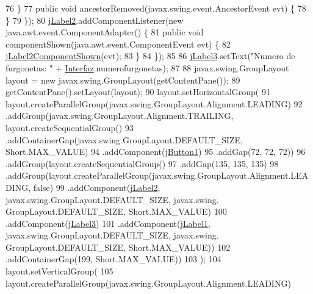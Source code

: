 \begin{DoxyCode}
76             \}
77             \textcolor{keyword}{public} \textcolor{keywordtype}{void} ancestorRemoved(javax.swing.event.AncestorEvent evt) \{
78             \}
79         \});
80         \mbox{\hyperlink{classejercicio2_1_1_interfaz_estadisticas_a227479001256e104ad41996508f6125e}{jLabel2}}.addComponentListener(\textcolor{keyword}{new} java.awt.event.ComponentAdapter() \{
81             \textcolor{keyword}{public} \textcolor{keywordtype}{void} componentShown(java.awt.event.ComponentEvent evt) \{
82                 \mbox{\hyperlink{classejercicio2_1_1_interfaz_estadisticas_a5108f18639c11d9e4c3e1b5db4a19f17}{jLabel2ComponentShown}}(evt);
83             \}
84         \});
85 
86         \mbox{\hyperlink{classejercicio2_1_1_interfaz_estadisticas_a7cdf095cdfd4621585f0a166faab002e}{jLabel3}}.setText(\textcolor{stringliteral}{"Numero de furgonetas: "} + \mbox{\hyperlink{namespace_interfaz}{Interfaz}}.numerofurgonetas);
87 
88         javax.swing.GroupLayout layout = \textcolor{keyword}{new} javax.swing.GroupLayout(getContentPane());
89         getContentPane().setLayout(layout);
90         layout.setHorizontalGroup(
91             layout.createParallelGroup(javax.swing.GroupLayout.Alignment.LEADING)
92             .addGroup(javax.swing.GroupLayout.Alignment.TRAILING, layout.createSequentialGroup()
93                 .addContainerGap(javax.swing.GroupLayout.DEFAULT\_SIZE, Short.MAX\_VALUE)
94                 .addComponent(\mbox{\hyperlink{classejercicio2_1_1_interfaz_estadisticas_a2e04a5a0eb4f298d827c33c859436a97}{jButton1}})
95                 .addGap(72, 72, 72))
96             .addGroup(layout.createSequentialGroup()
97                 .addGap(135, 135, 135)
98                 .addGroup(layout.createParallelGroup(javax.swing.GroupLayout.Alignment.LEADING, \textcolor{keyword}{false})
99                     .addComponent(\mbox{\hyperlink{classejercicio2_1_1_interfaz_estadisticas_a227479001256e104ad41996508f6125e}{jLabel2}}, javax.swing.GroupLayout.DEFAULT\_SIZE, javax.swing.
      GroupLayout.DEFAULT\_SIZE, Short.MAX\_VALUE)
100                     .addComponent(\mbox{\hyperlink{classejercicio2_1_1_interfaz_estadisticas_a7cdf095cdfd4621585f0a166faab002e}{jLabel3}})
101                     .addComponent(\mbox{\hyperlink{classejercicio2_1_1_interfaz_estadisticas_a5e051aa4c804a5eb48e3f047abce704c}{jLabel1}}, javax.swing.GroupLayout.DEFAULT\_SIZE, javax.swing.
      GroupLayout.DEFAULT\_SIZE, Short.MAX\_VALUE))
102                 .addContainerGap(199, Short.MAX\_VALUE))
103         );
104         layout.setVerticalGroup(
105             layout.createParallelGroup(javax.swing.GroupLayout.Alignment.LEADING)

\end{DoxyCode}
